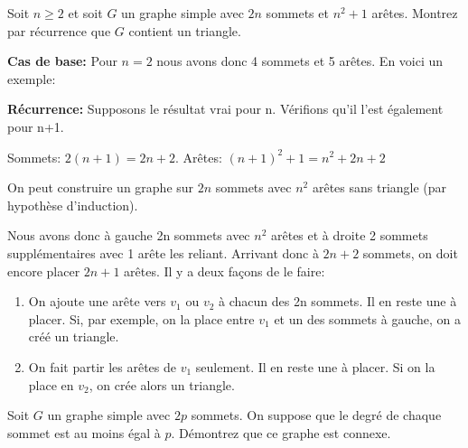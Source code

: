 \newpage


\begin{exo}
Soit $n\geq 2$ et soit $G$ un graphe simple avec $2n$ sommets et $n^2+1$ ar\^etes. Montrez par récurrence que $G$ contient un triangle.
\end{exo}

\textbf{Cas de base: }Pour $n=2$ nous avons donc 4 sommets et 5 arêtes. En voici un exemple:

\begin{figure}[!h]
\centering
\scalebox{.825}{}
\end{figure}

\textbf{Récurrence: }Supposons le résultat vrai pour n. Vérifions qu'il l'est également pour n+1.

Sommets: $2(n+1)=2n+2$. Arêtes: $(n+1)^2 + 1 = n^2 + 2n + 2$ 

On peut construire un graphe sur $2n$ sommets avec $n^2$ arêtes sans triangle (par hypothèse d'induction).

\begin{figure}[!h]
\centering
\scalebox{.825}{}
\end{figure}

Nous avons donc à gauche 2n sommets avec $n^2$ arêtes et à droite 2 sommets supplémentaires avec 1 arête les reliant. Arrivant donc à $2n + 2$ sommets, on doit encore placer $2n + 1$ arêtes. Il y a deux façons de le faire:

\begin{enumerate}
\item On ajoute une arête vers $v_1$ ou $v_2$ à chacun des 2n sommets. Il en reste une à placer. Si, par exemple, on la place entre $v_1$ et un des sommets à gauche, on a créé un triangle.
\item On fait partir les arêtes de $v_1$ seulement. Il en reste une à placer. Si on la place en $v_2$, on crée alors un triangle. 
\end{enumerate}


\begin{exo}
Soit $G$ un graphe simple avec $2p$ sommets. On suppose que le degr\'e de chaque sommet est au moins \'egal \`a $p$. D\'emontrez que ce graphe est connexe.
\end{exo}

